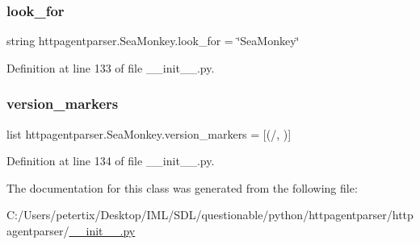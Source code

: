 \subsubsection{\texorpdfstring{look\+\_\+for}{look\_for}}
{\footnotesize\ttfamily string httpagentparser.\+Sea\+Monkey.\+look\+\_\+for = \char`\"{}Sea\+Monkey\char`\"{}\hspace{0.3cm}{\ttfamily [static]}}



Definition at line 133 of file \+\_\+\+\_\+init\+\_\+\+\_\+.\+py.

\hypertarget{classhttpagentparser_1_1_sea_monkey_ab0ddb8c4b36c97342c57f662b457d14d}{}\label{classhttpagentparser_1_1_sea_monkey_ab0ddb8c4b36c97342c57f662b457d14d} 
\subsubsection{\texorpdfstring{version\+\_\+markers}{version\_markers}}
{\footnotesize\ttfamily list httpagentparser.\+Sea\+Monkey.\+version\+\_\+markers = \mbox{[}(\textquotesingle{}/\textquotesingle{}, \textquotesingle{}\textquotesingle{})\mbox{]}\hspace{0.3cm}{\ttfamily [static]}}



Definition at line 134 of file \+\_\+\+\_\+init\+\_\+\+\_\+.\+py.



The documentation for this class was generated from the following file\+:\begin{DoxyCompactItemize}
\item 
C\+:/\+Users/petertix/\+Desktop/\+I\+M\+L/\+S\+D\+L/questionable/python/httpagentparser/httpagentparser/\hyperlink{____init_____8py}{\+\_\+\+\_\+init\+\_\+\+\_\+.\+py}\end{DoxyCompactItemize}

